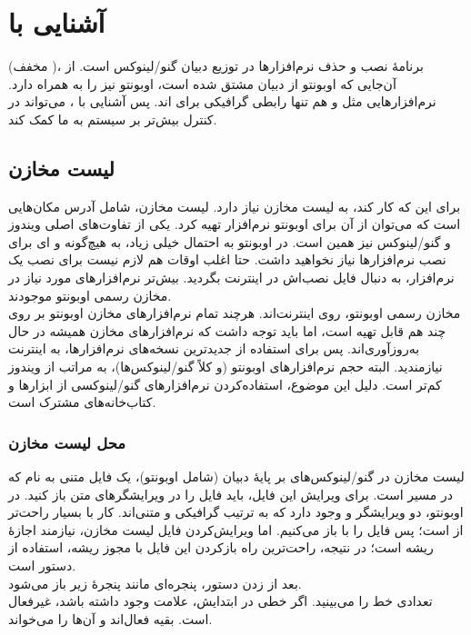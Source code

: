 \chapter[آشنایی با Apt]{آشنایی با }
 (مخفف )، برنامهٔ نصب و حذف نرم‌افزارها در توزیع دبیان گنو/لینوکس است. از آن‌جایی که اوبونتو از دبیان مشتق شده است، اوبونتو نیز  را به همراه دارد. نرم‌افزارهایی مثل  و  هم تنها رابطی گرافیکی برای  اند. پس آشنایی با ، می‌تواند در کنترل بیش‌تر بر سیستم به ما کمک کند.

\section{لیست مخازن}
برای این که  کار کند، به لیست مخازن نیاز دارد. لیست مخازن، شامل آدرس مکان‌هایی است که می‌توان از آن برای اوبونتو نرم‌افزار تهیه کرد. یکی از تفاوت‌های اصلی ویندوز و گنو/لینوکس نیز همین است. در اوبونتو به احتمال خیلی زیاد، به هیچ‌گونه  و ای برای نصب نرم‌افزارها نیاز نخواهید داشت. حتا اغلب اوقات هم لازم نیست برای نصب یک نرم‌افزار، به دنبال فایل نصب‌اش در اینترنت بگردید. بیش‌تر نرم‌افزارهای مورد نیاز در مخازن رسمی اوبونتو موجودند.\\
مخازن رسمی اوبونتو، روی اینترنت‌اند. هرچند تمام نرم‌افزارهای مخازن اوبونتو بر روی چند  هم قابل تهیه است، اما باید توجه داشت که نرم‌افزارهای مخازن همیشه در حال به‌روزآوری‌اند. پس برای استفاده از جدیدترین نسخه‌های نرم‌افزارها، به اینترنت نیازمندید. البته حجم نرم‌افزارهای اوبونتو (و کلاً گنو/لینوکس‌ها)، به مراتب از ویندوز کم‌تر است. دلیل این موضوع، استفاده‌کردن نرم‌افزارهای گنو/لینوکسی از ابزارها و کتاب‌خانه‌های مشترک است.\\
\subsection{محل لیست مخازن}
لیست مخازن در گنو/لینوکس‌های بر پایهٔ دبیان (شامل اوبونتو)، یک فایل متنی به نام  که در مسیر  است. برای ویرایش این فایل، باید فایل را در ویرایشگرهای متن باز کنید. در اوبونتو، دو ویرایشگر  و  وجود دارد که به ترتیب گرافیکی و متنی‌اند. کار با  بسیار راحت‌تر از  است؛ پس فایل را با  باز می‌کنیم. اما ویرایش‌کردن فایل لیست مخازن، نیازمند اجازهٔ ریشه است؛ در نتیجه، راحت‌ترین راه بازکردن این فایل با مجوز ریشه، استفاده از دستور  است.\\
بعد از زدن دستور، پنجره‌ای مانند پنجرهٔ زیر باز می‌شود.\\
تعدادی خط را می‌بینید. اگر خطی در ابتدایش، علامت \lr{\texttt{\#}} وجود داشته باشد، غیرفعال است. بقیه فعال‌اند و  آن‌ها را می‌خواند.

